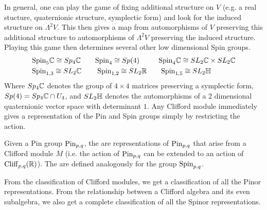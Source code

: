 In general, one can play the game of fixing additional structure on $V$
(e.g. a real stucture, quaternionic structure, symplectic form) and look
for the induced structure on $\Lambda^2V$. This then gives a map from
automorphisms of $V$ preserving this additional structure to automorphisms
of $\Lambda^2V$ preserving the induced structure. Playing this game then
determines several other low dimensional Spin groups.
%
\begin{align*}
&\mathrm{Spin}_5\mathbb{C} \cong Sp_4\mathbb{C} \qquad\mathrm{Spin}_4 \cong Sp(4) \qquad\:\:\:\mathrm{Spin}_4\mathbb{C} \cong SL_2\mathbb{C} \times
SL_2\mathbb{C} \\
&\mathrm{Spin}_{1,3} \cong SL_2\mathbb{C} \qquad\: \mathrm{Spin}_{1,2} \cong SL_2\mathbb{R} \qquad\mathrm{Spin}_{1,5} \cong SL_2\mathbb{H}
\end{align*}
%
Where $Sp_4\mathbb{C}$ denotes the group of $4\times4$ matrices preserving a symplectic
form, $Sp(4) = Sp_4\mathbb{C} \cap U_4$, and $SL_2\mathbb{H}$ denotes the automorphisms of a
$2$ dimensional quaternionic vector space with determinant $1$.
%
Any Clifford module immediately gives a representation of the Pin and Spin
groups simply by restricting the action.
%
\begin{defn}
Given a Pin group $\mathrm{Pin}_{p,q}$, the  are representations
of $\mathrm{Pin}_{p,q}$ that arise from a Clifford module $M$ (i.e. the action of $\mathrm{Pin}_{p,q}$
can be extended to an action of $\operatorname{Cliff}_{p,q}(\mathbb{R})$). The 
are defined analogously for the group $\mathrm{Spin}_{p,q}$.
\end{defn}
%
From the classification of Clifford modules, we get a classification of
all the Pinor representations. From the relationship between a Clifford
algebra and its even subalgebra, we also get a complete classification of all
the Spinor representations.
%
